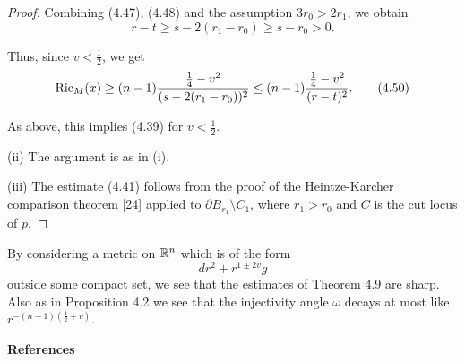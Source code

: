 \begin{proof}
Combining (4.47), (4.48) and the assumption $3r_0 > 2r_1$, we obtain
\begin{equation}
r - t \geq s - 2(r_1 - r_0) \geq s - r_0 > 0.
\tag{4.49}
\end{equation}

Thus, since $v < \frac{1}{2}$, we get
\begin{equation}
\operatorname{Ric}_M(x) \geq (n - 1)\frac{\frac{1}{4} - v^2}{(s - 2(r_1 - r_0))^2}
\leq (n - 1)\frac{\frac{1}{4} - v^2}{(r - t)^2}.
\tag{4.50}
\end{equation}

As above, this implies (4.39) for $v < \frac{1}{2}$.

(ii) The argument is as in (i).

(iii) The estimate (4.41) follows from the proof of the Heintze-Karcher
comparison theorem [24] applied to $\partial B_{r_1}\setminus C_1$, where
$r_1 > r_0$ and $C$ is the cut locus of $p$.
\end{proof}

\begin{remark}
\label{rem:sharpness-volume-growth-estimates}
By considering a metric on $\mathbb{R}^n$ which is of the form
\begin{equation}
dr^2 + r^{1\pm 2v}g
\tag{4.51}
\end{equation}
outside some compact set, we see that the estimates of Theorem 4.9 are sharp.
Also as in Proposition 4.2 we see that the injectivity angle $\tilde{\omega}$
decays at most like $r^{-(n-1)(\frac{1}{2}+v)}$.
\end{remark}

\begin{center}
\textbf{References}
\end{center}


